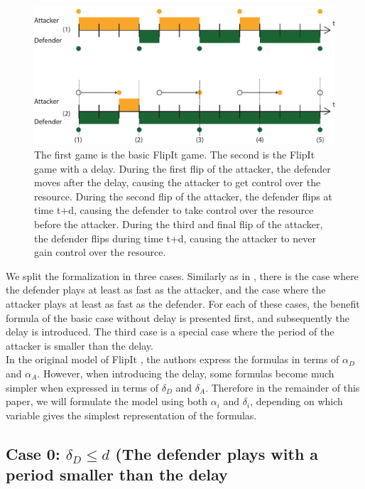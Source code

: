 \begin{figure}[hbtp]
\centering
\includegraphics[scale=0.7]{Images/Delayuitgelegd.pdf}
\caption{The first game is the basic FlipIt game. The second is the FlipIt game with a delay. During the first flip of the attacker, the defender moves after the delay, causing the attacker to get control over the resource. During the second flip of the attacker, the defender flips at time t+d, causing the defender to take control over the resource before the attacker. During the third and final flip of the attacker, the defender flips during time t+d, causing the attacker to never gain control over the resource. }
\label{dt}
\end{figure}


%
We split the formalization in three cases. Similarly as in \cite{FlipIt}, there is the case where the defender plays at least as fast as the attacker, and the case where the attacker plays at least as fast as the defender. For each of these cases, the benefit formula of the basic case without delay is presented first, and subsequently the delay is introduced.  The third case is a special case where the period of the attacker is smaller than the delay.\\

In the original model of FlipIt \cite{FlipIt}, the authors express the formulas in terms of $\alpha_{D}$ and $\alpha_{A}$. However, when introducing the delay, some formulas become much simpler when expressed in terms of $\delta_{D}$ and $\delta_{A}$. Therefore in the remainder of this paper, we will formulate the model using both $\alpha_{i}$ and $\delta_{i}$, depending on which variable gives the simplest representation of the formulas.

\subsection*{Case 0: $\delta_{D} \leq d$ (The defender plays with a period smaller than the delay}

